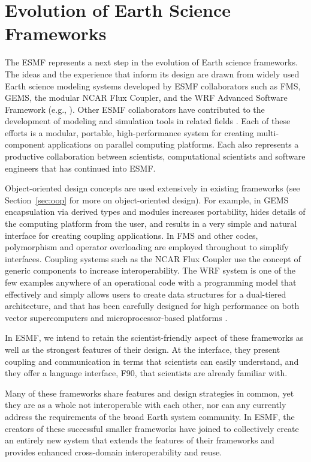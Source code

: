 \section{Evolution of Earth Science Frameworks}
\label{sec:archbackground}

The ESMF represents a next step in the evolution of Earth science
frameworks.  The ideas and the experience that inform its design
are drawn from widely used Earth science modeling systems 
developed by ESMF collaborators such as FMS, GEMS, the modular NCAR 
Flux Coupler, and the WRF Advanced Software Framework (e.g., \cite{fms, gems,
wrf, ncarcpl}).  Other ESMF collaborators 
have contributed to the development of modeling and simulation tools in related 
fields \cite{deluca, petsc}.  Each of these efforts is a modular,
portable, high-performance system for creating multi-component applications
on parallel computing platforms.  Each also represents a productive
collaboration between scientists, computational scientists and software
engineers that has continued into ESMF.  

Object-oriented design concepts are used extensively in existing frameworks
(see Section~\ref{sec:oop} for more on object-oriented design). For example, 
in GEMS encapsulation 
via derived types and modules increases portability, hides details of the 
computing platform from the user, and results in a very simple and natural
interface for creating coupling applications.  
In FMS and other codes, polymorphism and operator overloading are 
employed throughout to simplify interfaces.  Coupling systems such 
as the NCAR Flux Coupler use the concept of generic components to
increase interoperability.  The WRF system is one of the few 
examples anywhere of an operational code with a programming model 
that effectively and simply allows users to create data structures 
for a dual-tiered architecture, and that has been carefully designed 
for high performance on both vector supercomputers and microprocessor-based 
platforms \cite{wrfperfport}.

In ESMF, we intend to retain the scientist-friendly 
aspect of these frameworks as well as the strongest features of their design.  
At the interface, they present coupling and
communication in terms that scientists can easily understand, and they 
offer a language interface, F90, that scientists are already familiar 
with.  

Many of these frameworks share features and design strategies in common, yet 
they are as a whole not
interoperable with each other, nor can any currently address the requirements
of the broad Earth system community.  In ESMF, the creators of 
these successful smaller frameworks have joined to collectively create an
entirely new system that extends the features of their frameworks and provides 
enhanced cross-domain interoperability and reuse.




